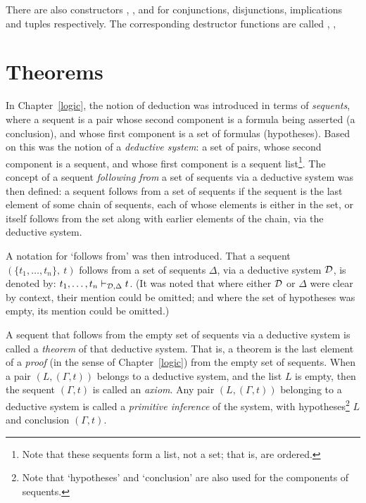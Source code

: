 \noindent There are also constructors
,
,
 and
for conjunctions, disjunctions, implications and tuples respectively.
The corresponding destructor functions are called , \etc,


\section{Theorems}
\label{avra_theorems}

In Chapter~\ref{logic}, the notion of deduction was introduced in terms
of {\it sequents\/}, where a sequent
is a pair whose second component is a formula being
asserted (a conclusion),
and whose first component is a set of formulas (hypotheses).
Based on this was the notion of a {\it deductive system\/}: a set of pairs,
whose second component is a sequent, and
whose first component is a sequent list\footnote{Note that these sequents
form a list, not a set; that is, are ordered.}.
The concept of a sequent {\it following from\/}
a set of sequents via a
deductive system was then defined: a sequent follows from a set of sequents if
the sequent
is the last element of some chain of sequents, each of whose
elements is either in the set, or itself follows from the set along with
earlier elements of the chain, via the deductive system.

A notation for `follows from' was then introduced.
That a
sequent $(\{t_1,\ldots,t_n\},\ t)$ follows from
a set of sequents $\Delta$, via a deductive system ${\cal D}$, is
denoted by: $t_1,\ldots,t_n\vdash_{{\cal D},\Delta} t$.
(It was noted that
where either ${\cal D}$ or $\Delta$ were clear by context, their mention
could be omitted; and where the set of hypotheses was empty,
its mention could be omitted.)

A sequent that follows from the empty set of sequents via
a deductive system is called a {\it theorem\/} of that deductive system.
That is, a theorem is the last element of a {\it proof\/} (in the sense
of Chapter~\ref{logic}) from the empty
set of sequents. When a pair $(L,(\Gamma,t))$ belongs to a deductive system,
and the list $L$ is empty,
then the sequent $(\Gamma,t)$ is called an {\it axiom\/}.
Any pair $(L,(\Gamma,t))$ belonging to
a deductive system is called a {\it primitive inference\/}
of the system, with hypotheses\footnote{Note that
`hypotheses' and `conclusion' are also used for the components
of sequents.} $L$ and
conclusion $(\Gamma,t)$.

